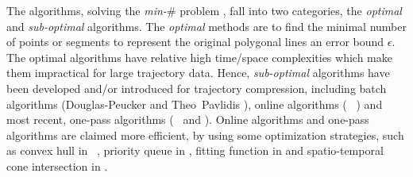 The \lsa algorithms, solving the \emph{min-$\#$} problem \cite{Chan:Optimal, Imai:Optimal,Pavlidis:Segment}, fall into two categories, \ie the \textit{optimal} and \textit{sub-optimal} algorithms. 
The \textit{optimal} methods\cite{Imai:Optimal,Chan:Optimal} are to find the minimal number of points or segments to represent the original polygonal lines \wrt an error bound $\epsilon$.
%
The optimal \lsa algorithms have relative high time/space complexities which make them impractical for large trajectory data.
Hence, \textit{sub-optimal} \lsa algorithms have been developed and/or introduced for trajectory compression, including batch algorithms (\eg Douglas-Peucker \cite{Douglas:Peucker, Meratnia:Spatiotemporal, Cao:Spatio} and Theo~Pavlidis \cite{Pavlidis:Segment}), online algorithms (\eg~\bqsa\cite{Liu:BQS} \squishe \cite{Muckell:Compression}) and most recent, one-pass algorithms (\eg~\operb \cite{Lin:Operb} and \cised \cite{Lin:Cised}). Online algorithms and one-pass algorithms are claimed more efficient, by using some optimization strategies, such as convex hull in \bqsa~\cite{Liu:BQS}, priority queue in \squishe \cite{Muckell:Compression}, {fitting function} in \operb \cite {Lin:Operb} and spatio-temporal cone intersection in \cised \cite {Lin:Cised}. 

